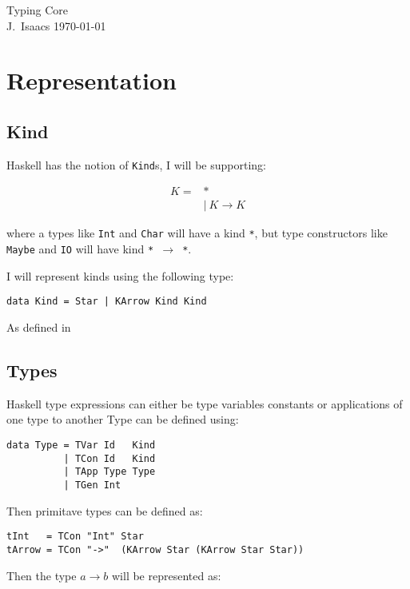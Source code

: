 \documentclass[12pt,a4paper,twoside]{article}
\begin{document}
\begin{center}
  \Large
  Typing Core\\[4mm]

  J.~Isaacs
  \today
\end{center}

\section{Representation}

\subsection{Kind}

Haskell has the notion of \texttt{Kind}s, I will be supporting:

\begin{align*}
K =& *\\ 
  &|\ K \rightarrow K
\end{align*}

where a types like \texttt{Int} and \texttt{Char} will have a kind \texttt{*}, but type constructors like \texttt{Maybe} and 
\texttt{IO} will have kind \texttt{* $\rightarrow$ *}.

I will represent kinds using the following type:

\begin{verbatim}
data Kind = Star | KArrow Kind Kind
\end{verbatim}

As defined in \cite{jones1999typing}

\subsection{Types}

Haskell type expressions can either be type variables constants or applications of one type to another
Type can be defined using:

\begin{verbatim}
data Type = TVar Id   Kind
          | TCon Id   Kind
          | TApp Type Type
          | TGen Int
\end{verbatim}

Then primitave types can be defined as:

\begin{verbatim}
tInt   = TCon "Int" Star
tArrow = TCon "->"  (KArrow Star (KArrow Star Star))
\end{verbatim}

Then the type $a \rightarrow b$ will be represented as:
\end{document}
